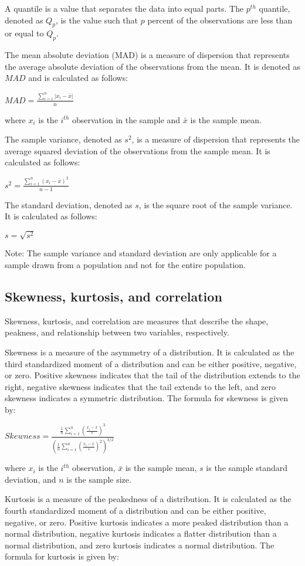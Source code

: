 \documentclass[12pt, a4paper, oneside]{article}
\begin{document}
A quantile is a value that separates the data into equal parts. The $p^{th}$ quantile, denoted as $Q_p$, is the value such that $p$ percent of the observations are less than or equal to $Q_p$.

The mean absolute deviation (MAD) is a measure of dispersion that represents the average absolute deviation of the observations from the mean. It is denoted as $MAD$ and is calculated as follows:

$MAD = \frac{\sum_{i=1}^{n}|x_i - \bar{x}|}{n}$

where $x_i$ is the $i^{th}$ observation in the sample and $\bar{x}$ is the sample mean.

The sample variance, denoted as $s^2$, is a measure of dispersion that represents the average squared deviation of the observations from the sample mean. It is calculated as follows:

$s^2 = \frac{\sum_{i=1}^{n}(x_i - \bar{x})^2}{n-1}$

The standard deviation, denoted as $s$, is the square root of the sample variance. It is calculated as follows:

$s = \sqrt{s^2}$

Note: The sample variance and standard deviation are only applicable for a sample drawn from a population and not for the entire population.
\subsection{ Skewness, kurtosis, and correlation  }
Skewness, kurtosis, and correlation are measures that describe the shape, peakness, and relationship between two variables, respectively.

Skewness is a measure of the asymmetry of a distribution. It is calculated as the third standardized moment of a distribution and can be either positive, negative, or zero. Positive skewness indicates that the tail of the distribution extends to the right, negative skewness indicates that the tail extends to the left, and zero skewness indicates a symmetric distribution. The formula for skewness is given by:

$Skewness = \frac{\frac{1}{n} \sum_{i=1}^{n} (\frac{x_i - \bar{x}}{s})^3}{(\frac{1}{n} \sum_{i=1}^{n} (\frac{x_i - \bar{x}}{s})^2)^{3/2}}$

where $x_i$ is the $i^{th}$ observation, $\bar{x}$ is the sample mean, $s$ is the sample standard deviation, and $n$ is the sample size.

Kurtosis is a measure of the peakedness of a distribution. It is calculated as the fourth standardized moment of a distribution and can be either positive, negative, or zero. Positive kurtosis indicates a more peaked distribution than a normal distribution, negative kurtosis indicates a flatter distribution than a normal distribution, and zero kurtosis indicates a normal distribution. The formula for kurtosis is given by:
\end{document}
